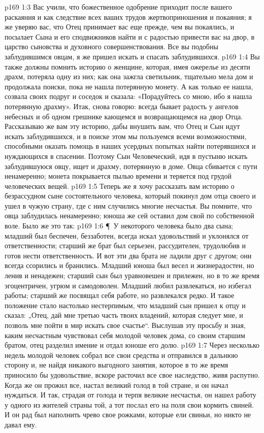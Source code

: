 \vs p169 1:3 Вас учили, что божественное одобрение приходит после вашего раскаяния и как следствие всех ваших трудов жертвоприношения и покаяния; я же уверяю вас, что Отец принимает вас еще прежде, чем вы покаялись, и посылает Сына и его сподвижников найти и с радостью привести вас на двор, в царство сыновства и духовного совершенствования. Все вы подобны заблудившимся овцам, я же пришел искать и спасать заблудившихся.
\vs p169 1:4 Вы также должны помнить историю о женщине, которая, имея ожерелье из десяти драхм, потеряла одну из них; как она зажгла светильник, тщательно мела дом и продолжала поиски, пока не нашла потерянную монету. А как только ее нашла, созвала своих подруг и соседок и сказала: «Порадуйтесь со мною, ибо я нашла потерянную драхму». Итак, снова говорю: всегда бывает радость у ангелов небесных и об одном грешнике кающемся и возвращающемся на двор Отца. Рассказываю же вам эту историю, дабы внушить вам, что Отец и Сын идут искать заблудившихся, и в поиске этом мы пользуемся всеми возможностями, способными оказать помощь в наших усердных попытках найти потерявшихся и нуждающихся в спасении. Поэтому Сын Человеческий, идя в пустыню искать заблудившуюся овцу, ищет и драхму, потерянную в доме. Овца сбивается с пути ненамеренно; монета покрывается пылью времени и теряется под грудой человеческих вещей.
\vs p169 1:5 Теперь же я хочу рассказать вам историю о безрассудном сыне состоятельного человека, который  покинул дом отца своего и ушел в чужую страну, где с ним случились многие несчастья. Вы помните, что овца заблудилась ненамеренно; юноша же сей оставил дом свой по собственной воле. Было же это так:
\vs p169 1:6 \P\ У некоторого человека было два сына; младший был беспечен, беззаботен, всегда искал удовольствий и уклонялся от ответственности; старший же брат был серьезен, рассудителен, трудолюбив и готов нести ответственность. И вот эти два брата не ладили друг с другом; они всегда ссорились и бранились. Младший юноша был весел и жизнерадостен, но ленив и ненадежен; старший сын был уравновешен и прилежен, но в то же время эгоцентричен, угрюм и самодоволен. Младший любил развлекаться, но избегал работы; старший же посвящал себя работе, но развлекался редко. И такое положение стало настолько нестерпимым, что младший сын пришел к отцу и сказал: „Отец, дай мне третью часть твоих владений, которая следует мне, и позволь мне пойти в мир искать свое счастье“. Выслушав эту просьбу и зная, каким несчастным чувствовал себя молодой человек дома, со своим старшим братом, отец разделил имение и отдал юноше его долю.
\vs p169 1:7 Через несколько недель молодой человек собрал все свои средства и отправился в дальнюю сторону и, не найдя никакого выгодного занятия, которое в то же время приносило бы удовольствие, вскоре расточил все свое наследство, живя распутно. Когда же он прожил все, настал великий голод в той стране, и он начал нуждаться. И так, страдая от голода и терпя великие несчастья, он нашел работу у одного из жителей страны той, а тот послал его на поля свои кормить свиней. И он рад был наполнить чрево свое рожками, которые ели свиньи, но никто не давал ему.
